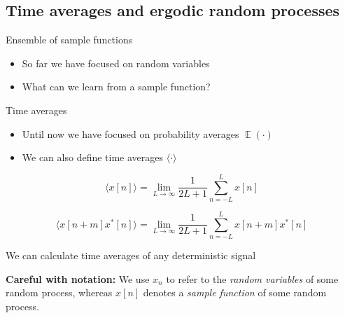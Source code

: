 \documentclass[10pt]{beamer}
\DeclareMathOperator{\E}{\mathbb{E}} %
\begin{document}
\subsection{Time averages and ergodic random processes}

\begin{frame}{Ensemble of sample functions}
\begin{itemize}
	\item So far we have focused on random variables
	\item What can we learn from a sample function?
\end{itemize}
\begin{center}
	\resizebox{0.9\linewidth}{!}{}
\end{center}
\end{frame}

%
\begin{frame}{Time averages}

\begin{itemize}
	\item Until now we have focused on probability averages $\E(\cdot)$
	\item We can also define time averages $\langle\cdot\rangle$
\end{itemize}

\begin{equation*}
\langle x[n] \rangle = \lim_{L\to\infty}\frac{1}{2L + 1}\sum_{n=-L}^L x[n]
\end{equation*}

\begin{equation*}
\langle x[n+m]x^*[n] \rangle = \lim_{L\to\infty}\frac{1}{2L + 1}\sum_{n=-L}^L x[n+m]x^*[n]
\end{equation*}

We can calculate time averages of any deterministic signal

\begin{center}
	\resizebox{0.8\linewidth}{!}{}
\end{center}

\textbf{Careful with notation:} We use $x_n$ to refer to the \textit{random variables} of some random process, whereas $x[n]$ denotes a \textit{sample function} of some random process.

\end{frame}
\end{document}
